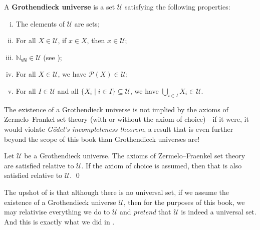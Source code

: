 \begin{definition}
\label{defGrothendieckUniverse}
A \textbf{Grothendieck universe} is a set $\mathcal{U}$ satisfying the following properties:
\begin{enumerate}[(i)]
\item The elements of $\mathcal{U}$ are sets;
\item For all $X \in \mathcal{U}$, if $x \in X$, then $x \in \mathcal{U}$;
\item $\mathbb{N}_{\mathsf{vN}} \in \mathcal{U}$ (see );
\item For all $X \in \mathcal{U}$, we have $\mathcal{P}(X) \in \mathcal{U}$;
\item For all $I \in \mathcal{U}$ and all $\{ X_i \mid i \in I \} \subseteq \mathcal{U}$, we have $\bigcup_{i \in I} X_i \in \mathcal{U}$.
\end{enumerate}
\end{definition}

The existence of a Grothendieck universe is not implied by the axioms of Zermelo--Frankel set theory (with or without the axiom of choice)---if it were, it would violate \textit{G\"{o}del's incompleteness theorem}, a result that is even further beyond the scope of this book than Grothendieck universes are!

\begin{theorem}
\label{thmGrothendieckUniversesAreModelOfZFC}
Let $\mathcal{U}$ be a Grothendieck universe. The axioms of Zermelo--Fraenkel set theory are satisfied relative to $\mathcal{U}$. If the axiom of choice is assumed, then that is also satisfied relative to $\mathcal{U}$. \qed
\end{theorem}

The upshot of  is that although there is no universal set, if we assume the existence of a Grothendieck universe $\mathcal{U}$, then for the purposes of this book, we may relativise everything we do to $\mathcal{U}$ and \textit{pretend} that $\mathcal{U}$ is indeed a universal set. And this is exactly what we did in .